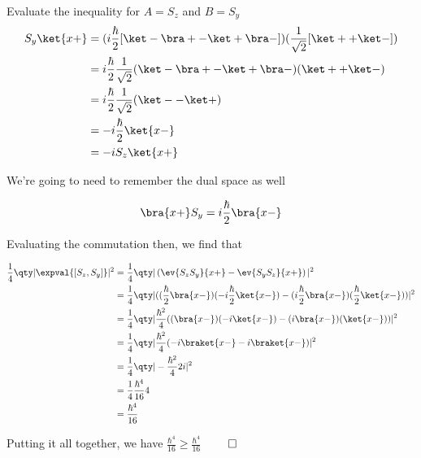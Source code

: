 \begin{answer}
\begin{answerpart}{Evaluate the inequality for \texorpdfstring{$A=S_z$ and $B=S_y$}{A=Sz and B=Sy}}
  \begin{equation}
    \begin{split}
      S_y\ket{x+} &= (i \frac{\hbar}{2} [\ket - \bra + - \ket + \bra - ])(\frac{1}{\sqrt{2}} [\ket + + \ket -])\\
      &= i \frac{\hbar}{2}\frac{1}{\sqrt{2}} (\ket - \bra + - \ket + \bra - )(\ket + + \ket -)\\
      &= i \frac{\hbar}{2}\frac{1}{\sqrt{2}} (\ket - - \ket +)\\
      &= - i \frac{\hbar}{2} \ket{x-}\\
      &= -i S_z\ket{x+}
    \end{split}
  \end{equation}
  
  We're going to need to remember the dual space as well

  \begin{equation}
    \bra{x+}S_y = i \frac{\hbar}{2} \bra{x-}
  \end{equation}
    
  Evaluating the commutation then, we find that

  \begin{equation}
    \begin{split}
      \frac{1}{4} \qty|\expval{[S_z,S_y]}|^2 &=
      \frac{1}{4} \qty|\left( \ev{S_zS_y}{x+} - \ev{S_yS_z}{x+} \right)|^2 \\
      &= \frac{1}{4} \qty|((\frac{\hbar}{2}\bra{x-})(-i\frac{\hbar}{2}\ket{x-}) - (i\frac{\hbar}{2}\bra{x-})(\frac{\hbar}{2}\ket{x-}))|^2 \\
      &= \frac{1}{4} \qty|\frac{\hbar^2}{4}((\bra{x-})(-i\ket{x-}) - (i\bra{x-})(\ket{x-}))|^2 \\
      &= \frac{1}{4} \qty|\frac{\hbar^2}{4}(-i\braket{x-} - i\braket{x-})|^2 \\
      &= \frac{1}{4} \qty|-\frac{\hbar^2}{4}2i|^2 \\
      &= \frac{1}{4} \frac{\hbar^4}{16} 4 \\
      &= \frac{\hbar^4}{16} \\
    \end{split}
  \end{equation}

  Putting it all together, we have $\frac{\hbar^4}{16} \ge \frac{\hbar^4}{16}$
  $\qed$

\end{answerpart}
\end{answer}

